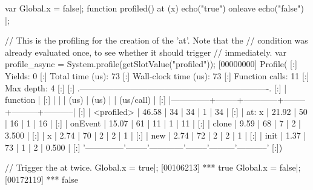 \begin{urbiscript}
var Global.x = false|;
function profiled()
{
  at (x)
    echo("true")
  onleave
    echo("false")
}|;

// This is the profiling for the creation of the 'at'. Note that the
// condition was already evaluated once, to see whether it should trigger
// immediately.
var profile_async = System.profile(getSlotValue("profiled"));
[00000000] Profile(
[:]  Yields:                    0
[:]  Total time (us):          73
[:]  Wall-clock time (us):     73
[:]  Function calls:           11
[:]  Max depth:                 4
[:]
[:]  .-------------------------------------------------------------------.
[:]  |   function   |   %
[:]  |              |        |    (us)    |  (us)  |         | (us/call) |
[:]  |--------------+--------+------------+--------+---------+-----------|
[:]  |   <profiled> |  46.58 |         34 |     34 |       1 |        34 |
[:]  |    at: { x } |  21.92 |         50 |     16 |       1 |        16 |
[:]  |      onEvent |  15.07 |         61 |     11 |       1 |        11 |
[:]  |        clone |   9.59 |         68 |      7 |       2 |     3.500 |
[:]  |            x |   2.74 |         70 |      2 |       2 |         1 |
[:]  |          new |   2.74 |         72 |      2 |       2 |         1 |
[:]  |         init |   1.37 |         73 |      1 |       2 |     0.500 |
[:]  '--------------'--------'------------'--------'---------'-----------'
[:])

// Trigger the at twice.
Global.x = true|;
[00106213] *** true
Global.x = false|;
[00172119] *** false


\end{urbiscript}
